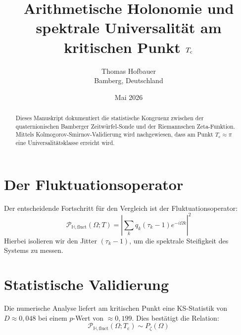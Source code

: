 \documentclass[11pt,a4paper,twocolumn]{article}
\title{Arithmetische Holonomie und spektrale Universalität am kritischen Punkt $\Tc$}
\author{Thomas Hofbauer \\ \small Bamberg, Deutschland}
\date{Mai 2026}
\newcommand{\Tc}{T_{\text{c}}}
\newcommand{\OmegaH}{\mathcal{P}_{\mathbb{H},\mathrm{fluct}}}
\begin{document}
\maketitle

\begin{abstract}
Dieses Manuskript dokumentiert die statistische Kongruenz zwischen der quaternionischen Bamberger Zeitwürfel-Sonde und der Riemannschen Zeta-Funktion. Mittels Kolmogorov-Smirnov-Validierung wird nachgewiesen, dass am Punkt $\Tc \approx \pi$ eine Universalitätsklasse erreicht wird.
\end{abstract}

\section{Der Fluktuationsoperator}
Der entscheidende Fortschritt für den Vergleich ist der Fluktuationsoperator:
\begin{equation}
    \OmegaH(\Omega;T) = \left| \sum_k q_k(\tau_k-1)e^{-i\Omega k} \right|^2
\end{equation}
Hierbei isolieren wir den Jitter $(\tau_k-1)$, um die spektrale Steifigkeit des Systems zu messen.

\section{Statistische Validierung}
Die numerische Analyse liefert am kritischen Punkt eine KS-Statistik von $D \approx 0,048$ bei einem $p$-Wert von $\approx 0,199$. Dies bestätigt die Relation:
\begin{equation}
    \OmegaH(\Omega;\Tc) \sim P_\zeta(\Omega)
\end{equation}

\end{document}

